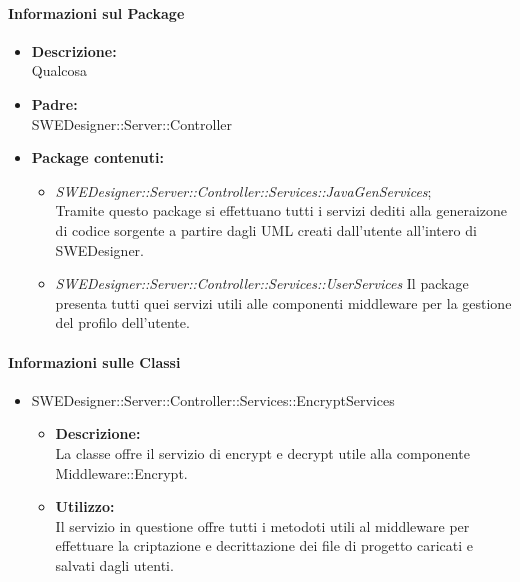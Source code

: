 		\paragraph{Informazioni sul Package}
		\begin{itemize}
			\item \textbf{Descrizione: }\\
			Qualcosa
			\item \textbf{Padre: }\\ SWEDesigner::Server::Controller
			\item \textbf{Package contenuti: }
			\begin{itemize}
				\item \emph{SWEDesigner::Server::Controller::Services::JavaGenServices};\\
				Tramite questo package si effettuano tutti i servizi dediti alla generaizone di codice sorgente a partire dagli UML creati dall'utente
				all'intero di SWEDesigner.
				\item \emph{SWEDesigner::Server::Controller::Services::UserServices}
				Il package presenta tutti quei servizi utili alle componenti middleware per la gestione del profilo dell'utente.
			\end{itemize}
		\end{itemize}
		\paragraph{Informazioni sulle Classi}
		\begin{itemize}
			\item SWEDesigner::Server::Controller::Services::EncryptServices
			\begin{itemize}
				\item \textbf{Descrizione: }\\
				La classe offre il servizio di encrypt e decrypt utile alla componente Middleware::Encrypt.
				\item \textbf{Utilizzo: }\\
				Il servizio in questione offre tutti i metodoti utili al middleware per effettuare la criptazione e decrittazione dei file di progetto caricati e salvati dagli utenti.
			\end{itemize}
		\end{itemize}

